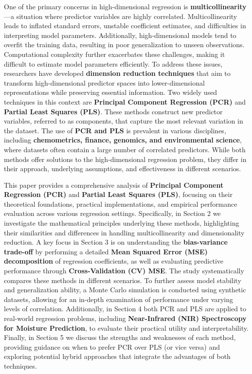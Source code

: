 \documentclass[11pt,twoside,a4paper]{article}
\begin{document}
One of the primary concerns in high-dimensional regression is \textbf{multicollinearity}—a situation where predictor variables are highly correlated. Multicollinearity leads to inflated standard errors, unstable coefficient estimates, and difficulties in interpreting model parameters. Additionally, high-dimensional models tend to overfit the training data, resulting in poor generalization to unseen observations. Computational complexity further exacerbates these challenges, making it difficult to estimate model parameters efficiently.
To address these issues, researchers have developed \textbf{dimension reduction techniques} that aim to transform high-dimensional predictor spaces into lower-dimensional representations while preserving essential information. Two widely used techniques in this context are \textbf{Principal Component Regression (PCR)} and \textbf{Partial Least Squares (PLS)}. These methods construct new predictor variables, referred to as components, that capture the most relevant variation in the dataset.
The use of \textbf{PCR and PLS} is prevalent in various disciplines, including \textbf{chemometrics, finance, genomics, and environmental science}, where datasets often contain a large number of correlated predictors. While both methods offer solutions to the high-dimensional regression problem, they differ in their approach, underlying assumptions, and effectiveness in different scenarios.

This paper provides a comprehensive analysis of  \textbf{Principal Component Regression (PCR)} and \textbf{Partial Least Squares (PLS)}, focusing on their theoretical foundations, practical implementations, and empirical performance evaluation across various regression settings. Specifically, in Section 2 we investigate the mathematical principles underlying these methods, highlighting their similarities and differences in handling multicollinearity and dimensionality reduction. A key focus in Section 3 is on understanding the \textbf{bias-variance trade-off} by performing a detailed \textbf{Mean Squared Error (MSE) decomposition} of regression coefficients, as well as evaluating predictive performance through \textbf{Cross-Validation (CV) MSE}. The study systematically compares these methods in different scenarios. To further assess model stability and generalization ability, a Monte Carlo simulation is conducted using synthetic datasets, allowing for an in-depth examination of performance under varying levels of correlation. Additionally, in Section 4 both PCR and PLS are applied to real-world regression problems, including \textbf{Near-Infrared (NIR) Spectroscopy for Moisture Prediction}, to evaluate their practical utility and interpretability. Finally, in Section 5 we discuss the strengths and weaknesses of each method, providing guidance on when to prefer PCR over PLS (or vice versa) and exploring potential hybrid approaches that integrate the advantages of both techniques.
\newpage
\end{document}
